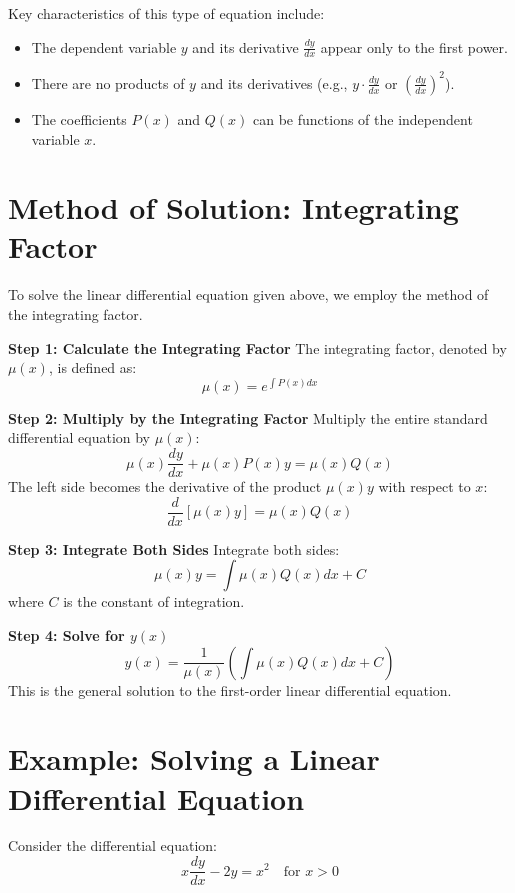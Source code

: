 \documentclass[12pt, letterpaper]{book}
\theoremstyle{problemstyle}
\theoremstyle{solutionstyle}
\begin{document}
Key characteristics of this type of equation include:
\begin{itemize}
    \item The dependent variable $y$ and its derivative $\frac{dy}{dx}$ appear only to the first power.
    \item There are no products of $y$ and its derivatives (e.g., $y \cdot \frac{dy}{dx}$ or $(\frac{dy}{dx})^2$).
    \item The coefficients $P(x)$ and $Q(x)$ can be functions of the independent variable $x$.
\end{itemize}

\section{Method of Solution: Integrating Factor}
To solve the linear differential equation given above, we employ the method of the integrating factor.

\textbf{Step 1: Calculate the Integrating Factor}
The integrating factor, denoted by $\mu(x)$, is defined as:
\begin{equation*}
    \mu(x) = e^{\int P(x)dx}
\end{equation*}

\textbf{Step 2: Multiply by the Integrating Factor}
Multiply the entire standard differential equation by $\mu(x)$:
\begin{equation*}
    \mu(x)\frac{dy}{dx} + \mu(x)P(x)y = \mu(x)Q(x)
\end{equation*}
The left side becomes the derivative of the product $\mu(x)y$ with respect to $x$:
\begin{equation*}
    \frac{d}{dx}[\mu(x)y] = \mu(x)Q(x)
\end{equation*}

\textbf{Step 3: Integrate Both Sides}
Integrate both sides:
\begin{equation*}
    \mu(x)y = \int \mu(x)Q(x)dx + C
\end{equation*}
where $C$ is the constant of integration.

\textbf{Step 4: Solve for $y(x)$}
\begin{equation*}
    y(x) = \frac{1}{\mu(x)} \left( \int \mu(x)Q(x)dx + C \right)
\end{equation*}
This is the general solution to the first-order linear differential equation.

\section{Example: Solving a Linear Differential Equation}
Consider the differential equation:
\begin{equation*}
    x\frac{dy}{dx} - 2y = x^2 \quad \text{for } x > 0
\end{equation*}
\end{document}
